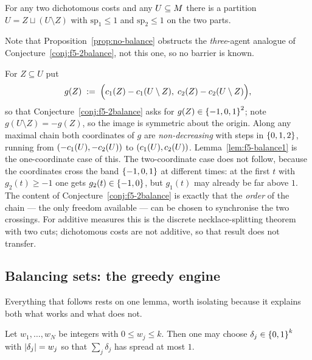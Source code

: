 \begin{conjecture}
\label{conj:f5-2balance}
For any two dichotomous costs and any $U \subseteq M$ there is a partition
$U = Z \sqcup (U \setminus Z)$ with $\mathrm{sp}_1 \le 1$ and
$\mathrm{sp}_2 \le 1$ on the two parts.
\end{conjecture}

Note that Proposition~\ref{prop:no-balance} obstructs the \emph{three}-agent
analogue of Conjecture~\ref{conj:f5-2balance}, not this one, so no barrier is
known.

\begin{remark}
\label{rem:f5-walk}
For $Z \subseteq U$ put
\[
  g(Z) \;:=\; \Big(c_1(Z) - c_1(U \setminus Z),\;
                   c_2(Z) - c_2(U \setminus Z)\Big),
\]
so that Conjecture~\ref{conj:f5-2balance} asks for $g(Z) \in \left\{-1,0,1\right\}^2$;
note $g(U \setminus Z) = -g(Z)$, so the image is symmetric about the origin.
Along any maximal chain both coordinates of $g$ are \emph{non-decreasing} with
steps in $\left\{0,1,2\right\}$, running from $(-c_1(U), -c_2(U))$ to
$(c_1(U), c_2(U))$. Lemma~\ref{lem:f5-balance1} is the one-coordinate
case of this. The two-coordinate case does not follow, because the coordinates
cross the band $\left\{-1,0,1\right\}$ at different times: at the first $t$ with
$g_2(t) \ge -1$ one gets $g_2(t) \in \left\{-1,0\right\}$, but $g_1(t)$ may already be
far above $1$. The content of Conjecture~\ref{conj:f5-2balance} is exactly that
the \emph{order} of the chain --- the only freedom available --- can be chosen to
synchronise the two crossings. For additive measures this is the discrete
necklace-splitting theorem with two cuts; dichotomous costs are not additive, so
that result does not transfer.
\end{remark}

\subsection{Balancing sets: the greedy engine}
\label{sec:f5-greedy}

Everything that follows rests on one lemma, worth isolating because it explains
both what works and what does not.

\begin{lemma}
\label{lem:f5-greedy}
Let $w_1,\dots,w_N$ be integers with $0 \le w_j \le k$. Then one may choose
$\delta_j \in \left\{0,1\right\}^k$ with $\left\lvert\delta_j\right\rvert = w_j$ so that $\sum_j \delta_j$
has spread at most $1$.
\end{lemma}

